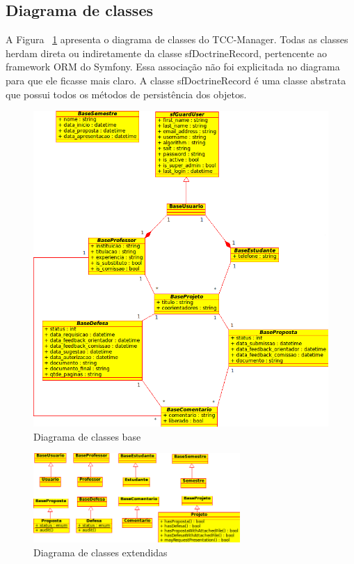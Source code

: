 \subsection{Diagrama de classes}

A Figura ~\ref{fig:diag_classes_base} apresenta o diagrama de classes do TCC-Manager. Todas as classes
herdam direta ou indiretamente da classe sfDoctrineRecord, pertencente ao framework ORM do Symfony. 
Essa associação não foi explicitada no diagrama para que ele ficasse mais claro. A classe sfDoctrineRecord
é uma classe abstrata que possui todos os métodos de persistência dos objetos.

\begin{figure}[htbp]
\centering
\includegraphics[width=1\textwidth]{fig/uml_classes_base.png}
\caption{Diagrama de classes base}
\label{fig:diag_classes_base}
\end{figure}

\begin{figure}[htbp]
\centering
\includegraphics[width=0.7\textwidth]{fig/uml_classes_principais.png}
\caption{Diagrama de classes extendidas}
\label{fig:diag_classes_principais}
\end{figure}

